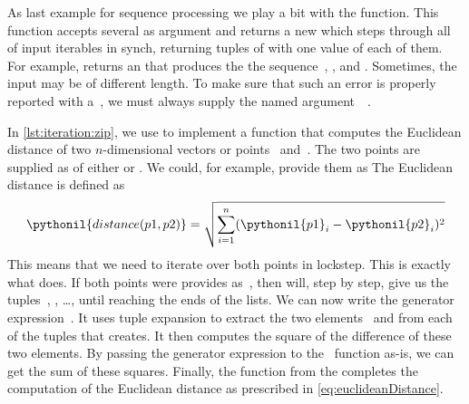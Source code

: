 %
%
%
%
%
%
\begin{sloppypar}%
As last example for sequence processing we play a bit with the  function.
This function accepts several  as argument and returns a new  which steps through all of input iterables in synch, returning tuples of with one value of each of them.
For example,  returns an  that produces the the sequence~, , and .
Sometimes, the input  may be of different length.
To make sure that such an error is properly reported with a~, we must always supply the named argument~~\cite{PEP618}.%
\end{sloppypar}%
%
In \cref{lst:iteration:zip}, we use  to implement a function  that computes the Euclidean distance of two $n$\nobreakdashes-dimensional vectors or points~ and~.
The two points are supplied as  of either  or .
We could, for example, provide them as 
The Euclidean distance is defined as%
%
\begin{equation}%
\pythonil{distance(p1, p2)} = \sqrt{\sum_{i=1}^n (\pythonil{p1}_i - \pythonil{p2}_i)^2}%
\label{eq:euclideanDistance}%
\end{equation}%
%
This means that we need to iterate over both points in lockstep.
This is exactly what  does.
If both points were provides as~, then  will, step by step, give us the tuples~, , {\dots}, until reaching the ends of the lists.
We can now write the generator expression~.
It uses tuple expansion to extract the two elements~ and  from each of the tuples that  creates.
It then computes the square of the difference of these two elements.
By passing the generator expression to the~ function as-is, we can get the sum of these squares.
Finally, the  function from the  completes the computation of the Euclidean distance as prescribed in \cref{eq:euclideanDistance}.

